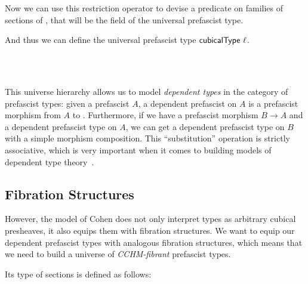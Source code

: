 Now we can use this restriction operator to devise a predicate  
on families of sections of , that will be the field  of the 
universal prefascist type.


And thus we can define the universal prefascist type \( \func{cubicalType}~\ell \).
% 
\begin{code}
\>[0]~\AgdaSymbol{:}~~~~\<%
\\
\>[0]~\AgdaBound{\ell}~%
\AgdaSymbol{=}~\AgdaSymbol{\{}~~\AgdaSymbol{=}~~~\AgdaSymbol{;}~%
~\AgdaSymbol{=}~~\AgdaSymbol{\}}\<%
\end{code}

This universe hierarchy allows us to model \emph{dependent types} in the 
category of prefascist types: given a prefascist \( A \), a dependent prefascist
on \( A \) is a prefascist morphism from \( A \) to .
% 
Furthermore, if we have a prefascist morphism \( B \to A \) and a dependent prefascist type
on \( A \), we can get a dependent prefascist type on \( B \) with a simple 
morphism composition.
% 
This ``substitution'' operation is strictly associative, which is very important when it
comes to building models of dependent type theory~.


\subsection{Fibration Structures}

However, the model of Cohen \etal does not only interpret types as arbitrary
cubical presheaves, it also equips them with fibration structures.
% 
We want to equip our dependent prefascist types with analogous 
fibration structures, which means that we need to build a universe of 
\emph{CCHM-fibrant} prefascist types. 

Its type of sections is defined as follows:
% 
% 
% 
% 

